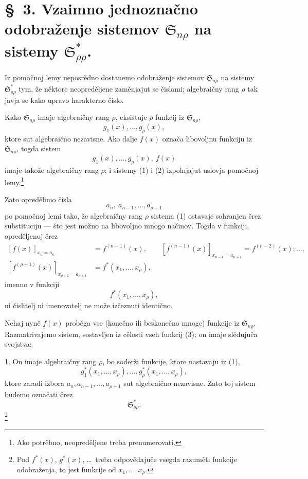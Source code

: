 \documentclass[11pt]{article}
\providecommand{\Ssys}{\mathfrak{S}}
\begin{document}
\section*{\S\ 3. Vzaimno jednoznačno odobraženje sistemov $\Ssys_{n\rho}$ na sistemy $\Ssys^*_{\rho\rho}$.}

Iz pomočnoj lemy neposrědno dostanemo odobraženje sistemov $\Ssys_{n\rho}$ na sistemy $\Ssys^*_{\rho\rho}$ tym, že něktore neopreděljene zaměnjajut se čislami; algebraičny rang $\rho$ tak javja se kako upravo harakterno čislo.

Kako $\Ssys_{n\rho}$ imaje algebraičny rang $\rho$, eksistuje $\rho$ funkcij iz $\Ssys_{n\rho}$,
\begin{equation}
  g_1(x),\ldots,g_\rho(x),
\tag{1}
\end{equation}
ktore sut algebraično nezavisne. Ako dalje $f(x)$ označa libovoljnu funkciju iz $\Ssys_{n\rho}$, togda sistem
\begin{equation}
  g_1(x),\ldots,g_\rho(x),\ f(x)
\tag{2}
\end{equation}
imaje takože algebraičny rang $\rho$; i sistemy (1) i (2) izpolnjajut uslovja pomočnoj lemy.\footnote{Ako potrěbno, neopreděljene treba prenumerovati.}

Zato opredělimo čisla
\[
  a_n,\ a_{n-1},\ldots,a_{\rho+1}
\]
po pomočnoj lemi tako, že algebraičny rang $\rho$ sistema (1) ostavaje sohranjen črez substituciju --- što jest možno na libovoljno mnogo načinov. Togda v funkciji, opreděljenoj črez
\[
\begin{aligned}
 [f(x)]_{x_n=a_n}&=f^{(n-1)}(x),\qquad
 [f^{(n-1)}(x)]_{x_{n-1}=a_{n-1}}=f^{(n-2)}(x);\ldots,\\
 [f^{(\rho+1)}(x)]_{x_{\rho+1}=a_{\rho+1}}&=f^*(x_1,
\ldots,x_\rho),
\end{aligned}
\]
imenno v funkciji
\begin{equation}
  f^*(x_1,\ldots,x_\rho),
\tag{3}
\end{equation}
ni čislitelj ni imenovatelj ne može izčeznuti identično.

Nehaj nyně $f(x)$ proběga vse (konečno ili beskonečno mnoge) funkcije iz $\Ssys_{n\rho}$. Razmatrivajemo sistem, sostavljen iz cělosti vseh funkcij (3); on imaje slědujuča svojstva:

1. On imaje algebraičny rang $\rho$, bo soderži funkcije, ktore nastavaju iz (1),
\[
  g_1^*(x_1,
\ldots,x_\rho),\ldots,g_\rho^*(x_1,\ldots,x_\rho),
\]
ktore zaradi izbora $a_n,a_{n-1},\ldots,a_{\rho+1}$ sut algebraično nezavisne. Zato toj sistem budemo označati črez
\[
  \Ssys^*_{\rho\rho}.
\]
\footnote{Pod $f^*(x)$, $g^*(x)$, \ldots\ treba odpovědajuče vsegda razuměti funkcije odobraženja, to jest funkcije od $x_1,\ldots,x_\rho$.}
\end{document}
